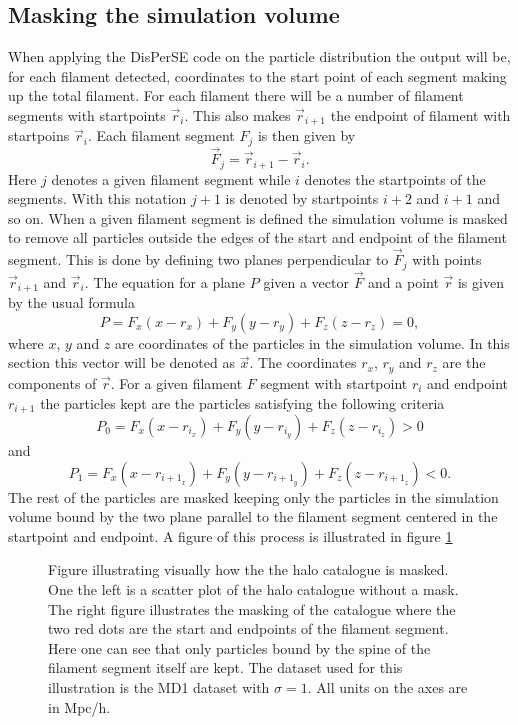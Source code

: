 \subsection{Masking the simulation volume}\label{sec:maskingfilament}
When applying the DisPerSE code on the particle distribution the output will be,
for each filament detected, coordinates to the start point of each segment
making up the total filament. For each filament there will be a number of
filament segments with startpoints $\vec{r}_i$. This also makes $\vec{r}_{i+1}$
the endpoint of filament with startpoins $\vec{r}_i$. Each filament segment $F_j$ is
then given by
\begin{equation}
    \vec{F}_{j}=\vec{r}_{i+1}-\vec{r}_i.
\end{equation}
Here $j$ denotes a given filament segment while $i$ denotes the startpoints of the
segments. With this notation $j+1$ is denoted by startpoints $i+2$ and $i+1$ and
so on. When a given filament segment is defined the simulation volume is masked
to remove all particles outside the edges of the start and endpoint of the
filament segment. This is done by defining  two planes perpendicular to
$\vec{F}_j$ with points $\vec{r}_{i+1}$ and $\vec{r}_i$. The equation for a
plane $P$ given a vector $\vec{F}$ and a point $\vec{r}$ is given
by the usual formula
\begin{equation}\label{eq:plane_mask}
    P=F_x(x-r_x)+F_y(y-r_y)+F_z(z-r_z)=0,
\end{equation}
where $x$, $y$ and $z$ are coordinates of the particles in the simulation
volume. In this section this vector will be denoted as $\vec{x}$.
The coordinates $r_x$, $r_y$ and $r_z$ are the components of $\vec{r}$.
For a given filament $F$ segment with startpoint $r_{i}$ and endpoint $r_{i+1}$ the particles kept are the particles
satisfying the following criteria
\begin{equation}
    P_0=F_x(x-r_{i_x})+F_y(y-r_{i_y})+F_z(z-r_{i_z})>0
\end{equation}
and
\begin{equation}
    P_1=F_x(x-r_{{i+1}_x})+F_y(y-r_{{i+1}_y})+F_z(z-r_{{i+1}_z})<0.
\end{equation}
The rest of the particles are masked keeping only the particles in the
simulation volume bound by the two plane parallel to the filament segment
centered in the startpoint and endpoint. A figure of this process is illustrated in figure \ref{fig:galaxy_catbbox}
\begin{figure}[htbp]
    \hspace{1em}%
    \caption{Figure illustrating visually how the the halo catalogue is masked. One the left is a scatter plot of the halo catalogue without a mask. The right figure illustrates the masking of the catalogue where the two red dots are the start and endpoints of the filament segment. Here one can see that only particles bound by the spine of the filament segment itself are kept. The dataset used for this illustration is the MD1 dataset with $\sigma=1$. All units on the axes are in Mpc/h.}
    \label{fig:galaxy_catbbox}
\end{figure}
